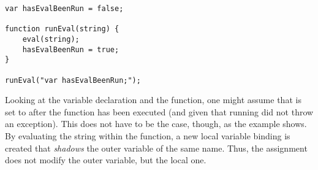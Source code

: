 \begin{verbatim}
var hasEvalBeenRun = false;

function runEval(string) {
    eval(string);
    hasEvalBeenRun = true;
}

runEval("var hasEvalBeenRun;");
\end{verbatim}

Looking at the variable declaration and the  function, one might assume that  is set to  after the function has been executed (and given that running  did not throw an exception). This does not have to be the case, though, as the example shows. By evaluating the string  within the function, a new local variable binding is created that \emph{shadows} the outer variable of the same name. Thus, the assignment does not modify the outer variable, but the local one.
